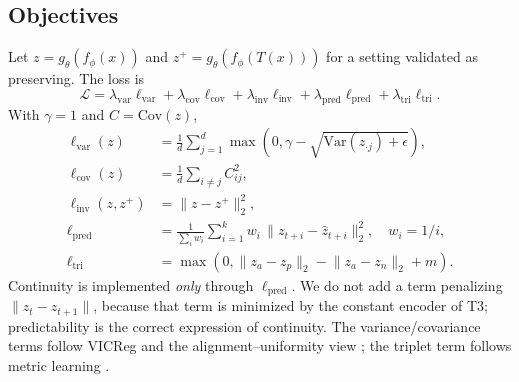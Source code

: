 \documentclass[11pt]{article}
\begin{document}
\subsection{Objectives}
Let $z=g_\theta(f_\phi(x))$ and $z^{+}=g_\theta(f_\phi(T(x)))$ for a setting
validated as preserving. The loss is
\begin{equation}
\mathcal{L} = \lambda_{\text{var}}\ell_{\text{var}} + \lambda_{\text{cov}}\ell_{\text{cov}} + \lambda_{\text{inv}}\ell_{\text{inv}} + \lambda_{\text{pred}}\ell_{\text{pred}} + \lambda_{\text{tri}}\ell_{\text{tri}}.
\end{equation}
With $\gamma=1$ and $C=\mathrm{Cov}(z)$,
\begin{align}
\ell_{\text{var}}(z) &= \frac{1}{d}\sum_{j=1}^{d}\max\!\left(0,\gamma-\sqrt{\mathrm{Var}(z_{\cdot j})+\epsilon}\right),\\
\ell_{\text{cov}}(z) &= \frac{1}{d}\sum_{i\ne j} C_{ij}^2, \\
\ell_{\text{inv}}(z,z^{+}) &= \lVert z-z^{+}\rVert_2^2, \\
\ell_{\text{pred}} &= \frac{1}{\sum_i w_i}\sum_{i=1}^{k} w_i\,\lVert z_{t+i}-\hat z_{t+i}\rVert_2^2, \quad w_i = 1/i, \\
\ell_{\text{tri}} &= \max\!\left(0,\lVert z_a-z_p\rVert_2-\lVert z_a-z_n\rVert_2+m\right).
\end{align}
Continuity is implemented \emph{only} through $\ell_{\text{pred}}$. We do not add a
term penalizing $\lVert z_t-z_{t+1}\rVert$, because that term is minimized by the
constant encoder of T3; predictability is the correct expression of continuity.
The variance/covariance terms follow VICReg \citep{bardes2022vicreg} and the
alignment--uniformity view \citep{wang2020alignment}; the triplet term follows
metric learning \citep{schroff2015facenet}.
\end{document}
